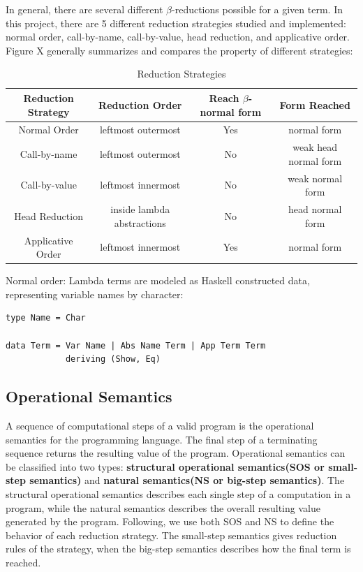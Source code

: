 In general, there are several different $\beta$-reductions possible for a given term. In this project, there are 5 different reduction strategies studied and implemented: normal order, call-by-name, call-by-value, head reduction, and applicative order. Figure X generally summarizes and compares the property of different strategies:
 
\begin{center}
\begin{table}[ht!]
\begin{tabular}{|c|c|c|c|}\hline
Reduction Strategy & Reduction Order & Reach $\beta$-normal form & Form Reached\\ \hline
Normal Order & leftmost outermost & Yes & normal form\\ \hline
Call-by-name & leftmost outermost & No  & weak head normal form\\ \hline
Call-by-value & leftmost innermost & No & weak normal form\\ \hline
Head Reduction & inside lambda abstractions & No & head normal form\\ \hline
Applicative Order & leftmost innermost & Yes & normal form\\ \hline
\end{tabular}
\caption{Reduction Strategies}
\end{table}
\end{center}
Normal order:
Lambda terms are modeled as Haskell constructed data, representing variable names by character:

\begin{verbatim}
type Name = Char  

data Term = Var Name | Abs Name Term | App Term Term
            deriving (Show, Eq)
\end{verbatim}


\subsection*{Operational Semantics}

A sequence of computational steps of a valid program is the operational semantics for the programming language. The final step of a terminating sequence returns the resulting value of the program. Operational semantics can be classified into two types: \textbf{structural operational semantics(SOS or small-step semantics)} and \textbf{natural semantics(NS or big-step semantics)}. The structural operational semantics describes each single step of a computation in a program, while the natural semantics describes the overall resulting value generated by the program. Following, we use both SOS and NS to define the behavior of each reduction strategy. The small-step semantics gives reduction rules of the strategy, when the big-step semantics describes how the final term is reached.  

